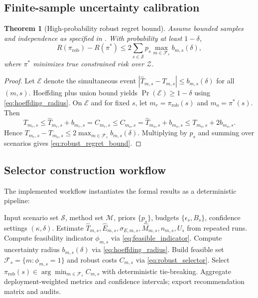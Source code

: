 \documentclass{article} %
\newtheorem{theorem}{Theorem}[section]
\begin{document}
\subsection{Finite-sample uncertainty calibration}
\begin{theorem}[High-probability robust regret bound]
\label{thm:robust_bound}
Assume bounded samples and independence as specified in . With probability at least $1-\delta$,
\begin{equation}
R(\pi_{\mathrm{rob}})-R(\pi^*)\le 2\sum_{s\in\mathcal{S}} p_s\max_{m\in\mathcal{F}_s} b_{m,s}(\delta),
\label{eq:robust_regret_bound}
\end{equation}
where $\pi^*$ minimizes true constrained risk over $\mathcal{Z}$.
\end{theorem}
\begin{proof}
Let $\mathcal{E}$ denote the simultaneous event $|\widehat{T}_{m,s}-T_{m,s}|\le b_{m,s}(\delta)$ for all $(m,s)$. Hoeffding plus union bound yields $\Pr(\mathcal{E})\ge 1-\delta$ using \eqref{eq:hoeffding_radius}. On $\mathcal{E}$ and for fixed $s$, let $m_r=\pi_{\mathrm{rob}}(s)$ and $m_o=\pi^*(s)$. Then
\[
T_{m_r,s}\le \widehat{T}_{m_r,s}+b_{m_r,s}=C_{m_r,s}\le C_{m_o,s}=\widehat{T}_{m_o,s}+b_{m_o,s}\le T_{m_o,s}+2b_{m_o,s}.
\]
Hence $T_{m_r,s}-T_{m_o,s}\le 2\max_{m\in\mathcal{F}_s}b_{m,s}(\delta)$. Multiplying by $p_s$ and summing over scenarios gives \eqref{eq:robust_regret_bound}.
\end{proof}

\subsection{Selector construction workflow}
The implemented workflow instantiates the formal results as a deterministic pipeline:
\begin{algorithm}[t]
\caption{Scenario-Conditioned Fourier Method Selector}
\label{alg:selector}
\begin{algorithmic}[1]
\STATE Input scenario set $\mathcal{S}$, method set $\mathcal{M}$, priors $\{p_s\}$, budgets $\{\epsilon_s,B_s\}$, confidence settings $(\kappa,\delta)$.
    \STATE Estimate $\widehat{T}_{m,s},\widehat{E}_{m,s},\sigma_{E,m,s},\widehat{M}_{m,s},n_{m,s},U_s$ from repeated runs.
    \STATE Compute feasibility indicator $\phi_{m,s}$ via \eqref{eq:feasible_indicator}.
    \STATE Compute uncertainty radius $b_{m,s}(\delta)$ via \eqref{eq:hoeffding_radius}.
  \ENDFOR
  \STATE Build feasible set $\mathcal{F}_s=\{m:\phi_{m,s}=1\}$ and robust costs $C_{m,s}$ via \eqref{eq:robust_selector}.
  \STATE Select $\pi_{\mathrm{rob}}(s)\in\arg\min_{m\in\mathcal{F}_s}C_{m,s}$ with deterministic tie-breaking.
\ENDFOR
\STATE Aggregate deployment-weighted metrics and confidence intervals; export recommendation matrix and audits.
\end{algorithmic}
\end{algorithm}
\end{document}
